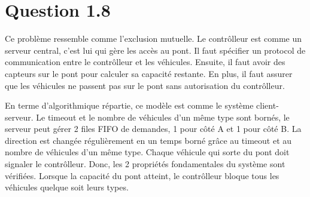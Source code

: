 \documentclass[a4paper,11pt]{report}
\begin{document}
\section{Question 1.8}
	Ce problème ressemble comme l'exclusion mutuelle. Le contrôlleur est comme un serveur central, c'est lui qui gère les accès au pont. Il faut spécifier un protocol de communication entre le contrôlleur et les véhicules. Ensuite, il faut avoir des capteurs sur le pont pour calculer sa capacité restante. En plus, il faut assurer que les véhicules ne passent pas sur le pont sans autorisation du contrôlleur.
	
	En terme d'algorithmique répartie, ce modèle est comme le système client-serveur. Le timeout et le nombre de véhicules d'un même type sont bornés, le serveur peut gérer 2 files FIFO de demandes, 1 pour côté A et 1 pour côté B. La direction est changée régulièrement en un temps borné grâce au timeout et au nombre de véhicules d'un même type. Chaque véhicule qui sorte du pont doit signaler le contrôlleur. Donc, les 2 propriétés fondamentales du système sont vérifiées. Lorsque la capacité du pont atteint, le contrôlleur bloque tous les véhicules quelque soit leurs types.
\end{document}
